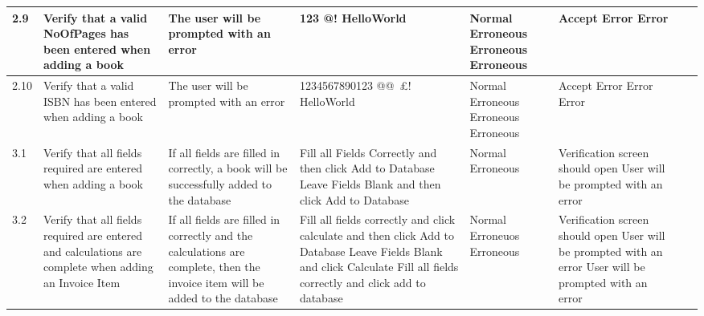 \begin{landscape}
\begin{center}
\begin{longtable}{|p{1.5cm}|p{2.5cm}|p{2.5cm}|p{2cm}|p{2cm}|p{2cm}|p{2cm}|p{2cm}|}
        2.9 & Verify that a valid NoOfPages has been entered when adding a book & The user will be prompted with an error & 123 \newline 123456789 \newline 2.3 \newline @! \newline HelloWorld & Normal \newline Erroneous \newline Erroneous \newline Erroneous & Accept \newline Error \newline Error& & \\ \hline
        2.10 & Verify that a valid ISBN has been entered when adding a book & The user will be prompted with an error & 1234567890123 \newline @@~£! \newline 123 \newline HelloWorld & Normal \newline Erroneous \newline Erroneous \newline Erroneous & Accept \newline Error \newline Error \newline Error & & \\ \hline
        3.1 & Verify that all fields required are entered when adding a book & If all fields are filled in correctly, a book will be successfully added to the database & Fill all Fields Correctly and then click Add to Database \newline Leave Fields Blank and then click Add to Database & Normal \newline Erroneous & Verification screen should open \newline User will be prompted with an error & & \\ \hline
        3.2 & Verify that all fields required are entered and calculations are complete when adding an Invoice Item & If all fields are filled in correctly and the calculations are complete, then the invoice item will be added to the database & Fill all fields correctly and click calculate and then click Add to Database \newline Leave Fields Blank and click Calculate \newline Fill all fields correctly and click add to database & Normal \newline Erroneuos \newline Erroneous & Verification screen should open \newline User will be prompted with an error \newline User will be prompted with an error & & \\ \hline

\end{longtable}
\end{center}
\end{landscape}
